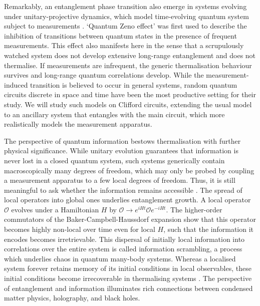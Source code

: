 \documentclass[10pt]{article}
\begin{document}
Remarkably, an entanglement phase transition also emerge in systems evolving under unitary-projective dynamics, which model time-evolving quantum system subject to measurements \cite{skinner2019measurement, li2019measurement, chan2019unitary}. `Quantum Zeno effect' was first used to describe the inhibition of transitions between quantum states in the presence of frequent measurements. This effect also manifests here in the sense that a scrupulously watched system does not develop extensive long-range entanglement and does not thermalise. If measurements are infrequent, the generic thermalisation behaviour survives and long-range quantum correlations develop. While the measurement-induced transition is believed to occur in general systems, random quantum circuits discrete in space and time have been the most productive setting for their study. We will study such models on Clifford circuits, extending the usual model to an ancillary system that entangles with the main circuit, which more realistically models the measurement apparatus.

The perspective of quantum information bestows thermalisation with further physical significance. While unitary evolution guarantees that information is never lost in a closed quantum system, such systems generically contain macroscopically many degrees of freedom, which may only be probed by coupling a measurement apparatus to a few local degrees of freedom. Thus, it is still meaningful to ask whether the information remains accessible \cite{sekino2008fast, nahum2017quantum, choi1903quantum}. The spread of local operators into global ones underlies entanglement growth. A local operator $\mathcal{O}$ evolves under a Hamiltonian $H$ by $\mathcal{O} \rightarrow e^{iHt} \mathcal{O} e^{-iHt}$. The higher-order commutators of the Baker-Campbell-Haussdorf expansion show that this operator becomes highly non-local over time even for local $H$, such that the information it encodes becomes irretrievable. This dispersal of initially local information into correlations over the entire system is called information scrambling, a process which underlies chaos in quantum many-body systems. Whereas a localised system forever retains memory of its initial conditions in local observables, these initial conditions become irrecoverable in thermalising systems \cite{nandkishore2015many}. The perspective of entanglement and information illuminates rich connections between condensed matter physics, holography, and black holes.
\end{document}
